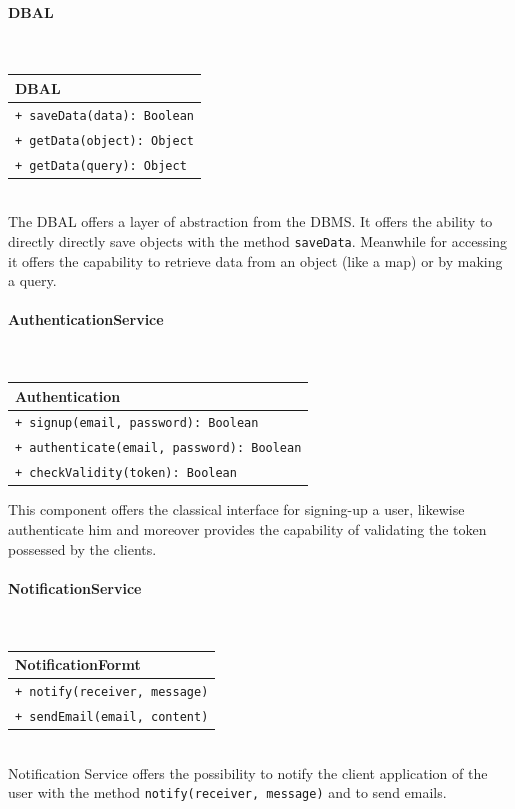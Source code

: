 \paragraph{DBAL}\mbox{}\\
\begin{table}[h]
    \centering
    \begin{tabular}{|l|}
        \hline
        \textbf{DBAL} \\
        \hline
        \verb|+ saveData(data): Boolean|\\
        \verb|+ getData(object): Object|\\
        \verb|+ getData(query): Object|\\
        \hline
    \end{tabular}
\end{table}
\\
The DBAL offers a layer of abstraction from the DBMS. It offers the ability to directly directly save objects with the method \verb|saveData|. Meanwhile for accessing it offers the capability to retrieve data from an object (like a map) or by making a query.

\paragraph{AuthenticationService}\mbox{}\\

\begin{table}[h]
    \centering
    \begin{tabular}{|l|}
        \hline
        \textbf{Authentication} \\
        \hline
         \verb|+ signup(email, password): Boolean|\\
         \verb|+ authenticate(email, password): Boolean|\\
         \verb|+ checkValidity(token): Boolean|\\
         \hline
    \end{tabular}
\end{table}
This component offers the classical interface for signing-up a user, likewise authenticate him and moreover provides the capability of validating the token possessed by the clients.

\paragraph{NotificationService}\mbox{}\\
\begin{table}[h]
    \centering
    \begin{tabular}{|l|}
        \hline
        \textbf{NotificationFormt} \\
        \hline
         \verb|+ notify(receiver, message)|\\
         \verb|+ sendEmail(email, content)|\\
         \hline
    \end{tabular}
\end{table}
\\
Notification Service offers the possibility to notify the client application of the user with the method \verb|notify(receiver, message)| and to send emails.

